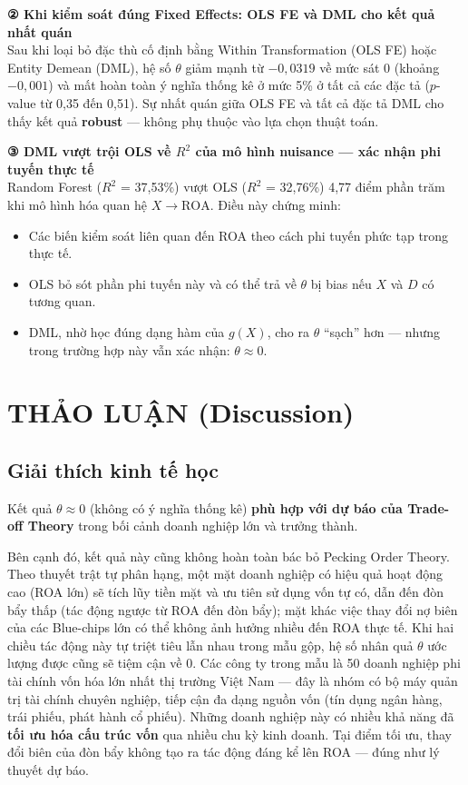 \documentclass[12pt,a4paper]{article}
\begin{document}
\noindent\textbf{② Khi kiểm soát đúng Fixed Effects: OLS FE và DML cho kết quả nhất quán} \\
Sau khi loại bỏ đặc thù cố định bằng Within Transformation (OLS FE) hoặc Entity Demean (DML), hệ số $\theta$ giảm mạnh từ $-0,0319$ về mức sát 0 (khoảng $-0,001$) và mất hoàn toàn ý nghĩa thống kê ở mức 5\% ở tất cả các đặc tả ($p$-value từ 0,35 đến 0,51). Sự nhất quán giữa OLS FE và tất cả đặc tả DML cho thấy kết quả \textbf{robust} --- không phụ thuộc vào lựa chọn thuật toán.

\noindent\textbf{③ DML vượt trội OLS về $R^2$ của mô hình nuisance --- xác nhận phi tuyến thực tế} \\
Random Forest ($R^2$ = 37,53\%) vượt OLS ($R^2$ = 32,76\%) 4,77 điểm phần trăm khi mô hình hóa quan hệ $X \rightarrow \text{ROA}$. Điều này chứng minh:
\begin{itemize}
    \item Các biến kiểm soát liên quan đến ROA theo cách phi tuyến phức tạp trong thực tế.
    \item OLS bỏ sót phần phi tuyến này và có thể trả về $\theta$ bị bias nếu $X$ và $D$ có tương quan.
    \item DML, nhờ học đúng dạng hàm của $g(X)$, cho ra $\theta$ ``sạch'' hơn --- nhưng trong trường hợp này vẫn xác nhận: $\theta \approx 0$.
\end{itemize}

\section{THẢO LUẬN (Discussion)}

\subsection{Giải thích kinh tế học}
Kết quả $\theta \approx 0$ (không có ý nghĩa thống kê) \textbf{phù hợp với dự báo của Trade-off Theory} trong bối cảnh doanh nghiệp lớn và trưởng thành.

Bên cạnh đó, kết quả này cũng không hoàn toàn bác bỏ Pecking Order Theory. Theo thuyết trật tự phân hạng, một mặt doanh nghiệp có hiệu quả hoạt động cao (ROA lớn) sẽ tích lũy tiền mặt và ưu tiên sử dụng vốn tự có, dẫn đến đòn bẩy thấp (tác động ngược từ ROA đến đòn bẩy); mặt khác việc thay đổi nợ biên của các Blue-chips lớn có thể không ảnh hưởng nhiều đến ROA thực tế. Khi hai chiều tác động này tự triệt tiêu lẫn nhau trong mẫu gộp, hệ số nhân quả $\theta$ ước lượng được cũng sẽ tiệm cận về 0.
Các công ty trong mẫu là 50 doanh nghiệp phi tài chính vốn hóa lớn nhất thị trường Việt Nam --- đây là nhóm có bộ máy quản trị tài chính chuyên nghiệp, tiếp cận đa dạng nguồn vốn (tín dụng ngân hàng, trái phiếu, phát hành cổ phiếu). Những doanh nghiệp này có nhiều khả năng đã \textbf{tối ưu hóa cấu trúc vốn} qua nhiều chu kỳ kinh doanh. Tại điểm tối ưu, thay đổi biên của đòn bẩy không tạo ra tác động đáng kể lên ROA --- đúng như lý thuyết dự báo.
\end{document}
